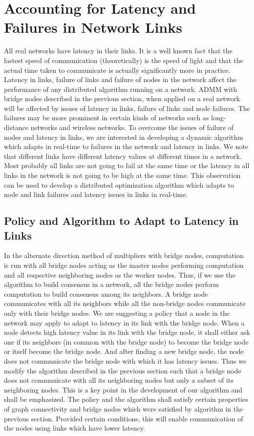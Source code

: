 \documentclass[letterpaper, 10 pt, conference]{ieeeconf}  %
\begin{document}
\section{Accounting for Latency and Failures in Network Links}

All real networks have latency in their links. It is a well known fact that the fastest speed of communication (theoretically) is the speed of light and that the actual time taken to communicate is actually significantly more in practice. Latency in links, failure of links and failure of nodes in the network affect the performance of any distributed algorithm running on a network. ADMM with bridge nodes described in the previous section, when applied on a real network will be affected by issues of latency in links, failure of links and node failures. The failures may be more prominent in certain kinds of networks such as long-distance networks and wireless networks. To overcome the issues of failure of nodes and latency in links, we are interested in developing a dynamic algorithm which adapts in real-time to failures in the network and latency in links. We note that different links have different latency values at different times in a network. Most probably all links are not going to fail at the same time or the latency in all links in the network is not going to be high at the same time. This observation can be used to develop a distributed optimization algorithm which adapts to node and link failures and latency issues in links in real-time. 

\subsection{Policy and Algorithm to Adapt to Latency in Links}

In the alternate direction method of multipliers with bridge nodes, computation is run with all bridge nodes acting as the master nodes performing computation and all respective neighboring nodes as the worker nodes. Thus, if we use the algorithm to build consensus in a network, all the bridge nodes perform computation to build consensus among its neighbors. A bridge node communicates with all its neighbors while all the non-bridge nodes communicate only with their bridge nodes. We are suggesting a policy that a node in the network may apply to adapt to latency in its link with the bridge node. When a node detects high latency value in its link with the bridge node, it shall either ask one if its neighbors (in common with the bridge node) to become the bridge node or itself become the bridge node. And after finding a new bridge node, the node does not communicate the bridge node with which it has latency issues. Thus we modify the algorithm described in the previous section such that a bridge node does not communicate with all its neighboring nodes but only a subset of its neighboring nodes. This is a key point in the development of our algorithm and shall be emphasized. The policy and the algorithm shall satisfy certain properties of graph connectivity and bridge nodes which were satisfied by algorithm in the previous section. Provided certain conditions, this will enable communication of the nodes using links which have lower latency. 
\end{document}
